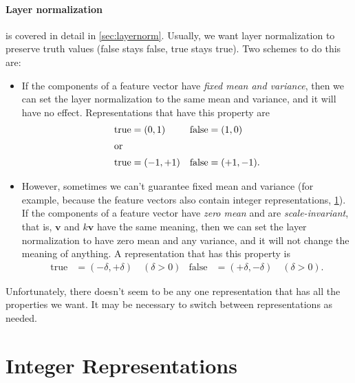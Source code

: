 \paragraph{Layer normalization} is covered in detail in \cref{sec:layernorm}. Usually, we want layer normalization to preserve truth values (false stays false, true stays true). Two schemes to do this are:
\begin{itemize}
\item If the components of a feature vector have \emph{fixed mean and variance}, then we can set the layer normalization to the same mean and variance, and it will have no effect. Representations that have this property are
  \begin{align*}
    \text{true} &= (0, 1) & \text{false} &= (1, 0) \\
    \intertext{or}
    \text{true} &= (-1, +1) & \text{false} &= (+1, -1).
  \end{align*}
\item However, sometimes we can't guarantee fixed mean and variance (for example, because the feature vectors also contain integer representations, \cref{sec:integers}). If the components of a feature vector have \emph{zero mean} and are \emph{scale-invariant}, that is, $\mathbf{v}$ and $k\mathbf{v}$ have the same meaning, then we can set the layer normalization to have zero mean and any variance, and it will not change the meaning of anything. A representation that has this property is
  \begin{align*}
    \text{true} &= (-\delta, +\delta) \quad (\delta>0) & \text{false} &= (+\delta, -\delta) \quad (\delta>0).
  \end{align*}
\end{itemize}

Unfortunately, there doesn't seem to be any one representation that has all the properties we want. It may be necessary to switch between representations as needed.

\section{Integer Representations}
\label{sec:integers}

